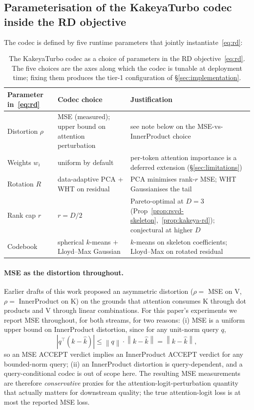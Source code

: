 \documentclass[11pt,a4paper]{article}
\theoremstyle{definition}
\theoremstyle{plain}
\newcommand{\norm}[1]{\left\lVert#1\right\rVert}
\begin{document}
\subsection{Parameterisation of the KakeyaTurbo codec inside the RD objective}
\label{sec:parameterisation}

The codec is defined by five runtime parameters that jointly instantiate~\eqref{eq:rd}:

\begin{table}[H]
\centering
\small
\caption{The KakeyaTurbo codec as a choice of parameters in the RD objective~\eqref{eq:rd}. The five choices are the axes along which the codec is tunable at deployment time; fixing them produces the tier-1 configuration of \S\ref{sec:implementation}.}
\label{tab:rd-mapping}
\begin{tabular}{lll}
  \toprule
  Parameter in~\eqref{eq:rd} & Codec choice & Justification \\
  \midrule
  Distortion $\rho$ & MSE (measured); upper bound on attention perturbation & see note below on the MSE-vs-InnerProduct choice \\
  Weights $w_i$ & uniform by default & per-token attention importance is a deferred extension (\S\ref{sec:limitations}) \\
  Rotation $R$ & data-adaptive PCA + WHT on residual & PCA minimises rank-$r$ MSE; WHT Gaussianises the tail \\
  Rank cap $r$ & $r = D/2$ & Pareto-optimal at $D = 3$ (Prop~\ref{prop:rsvd-skeleton},~\ref{prop:kakeya-rd}); conjectural at higher $D$ \\
  Codebook & spherical $k$-means $+$ Lloyd--Max Gaussian & $k$-means on skeleton coefficients; Lloyd--Max on rotated residual \\
  \bottomrule
\end{tabular}
\end{table}

\paragraph{MSE as the distortion throughout.}
Earlier drafts of this work proposed an asymmetric distortion ($\rho = $ MSE on V, $\rho = $ InnerProduct on K) on the grounds that attention consumes K through dot products and V through linear combinations. For this paper's experiments we report MSE throughout, for both streams, for two reasons: (i) MSE is a uniform upper bound on InnerProduct distortion, since for any unit-norm query $q$,
\[
|q^\top (k - \hat k)| \leq \norm{q} \cdot \norm{k - \hat k} = \norm{k - \hat k},
\]
so an MSE ACCEPT verdict implies an InnerProduct ACCEPT verdict for any bounded-norm query; (ii) an InnerProduct distortion is query-dependent, and a query-conditional codec is out of scope here. The resulting MSE measurements are therefore \emph{conservative} proxies for the attention-logit-perturbation quantity that actually matters for downstream quality; the true attention-logit loss is at most the reported MSE loss.
\end{document}

